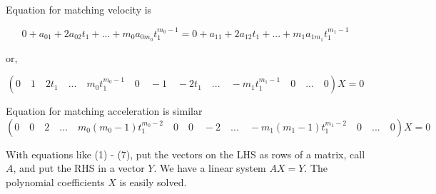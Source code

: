 \documentclass[a4paper]{article}
\begin{document}
  	Equation for matching velocity is
  	
  	\begin{equation*}
  		0+a_{01}+2a_{02}t_{1}+...+m_{0} a_{0m_{0}} t_{1}^{m_{0}-1}=
  		0+a_{11}+2a_{12}t_{1}+...+m_{1} a_{1m_{1}} t_{1}^{m_{1}-1}
  	\end{equation*}
  	
  	or,
  	
  	\begin{equation}
  	(0 \quad 1 \quad 2t_{1} \quad ... \quad m_{0} t_{1}^{m_{0}-1} \quad 
  	0 \quad -1 \quad -2t_{1} \quad ... \quad -m_{1} t_{1}^{m_{1}-1} \quad 
  	0 \quad... \quad 0)X=0
  	\end{equation}
  	
  	Equation for matching acceleration is similar
  	\begin{equation}
  	(0 \quad 0 \quad 2 \quad ... \quad m_{0} (m_{0}-1) t_{1}^{m_{0}-2} \quad
  	0 \quad 0 \quad -2 \quad ... \quad -m_{1} (m_{1}-1) t_{1}^{m_{1}-2} \quad
  	0 \quad... \quad 0)X=0
  	\end{equation}
  	
  	With equations like (1) - (7), put the vectors on the LHS as rows of a matrix, call $A$, and put the RHS in a vector $Y$. We have a linear system $AX=Y$. The polynomial coefficients $X$ is easily solved.

  
\end{document}
